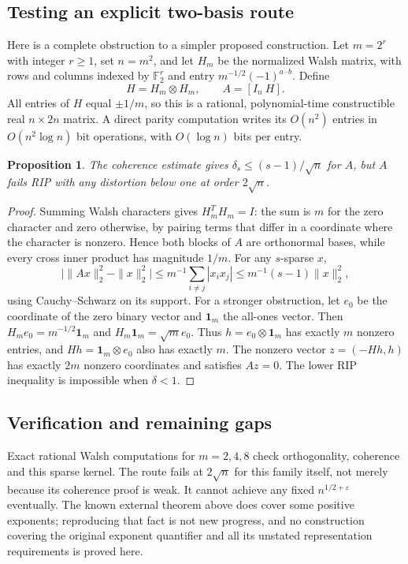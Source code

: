 \documentclass[11pt]{article}
\newtheorem{proposition}{Proposition}
\begin{document}
\subsection{Testing an explicit two-basis route}
Here is a complete obstruction to a simpler proposed construction. Let $m=2^r$ with integer $r\ge1$, set $n=m^2$, and let $H_m$ be the normalized Walsh matrix, with rows and columns indexed by $\mathbb F_2^r$ and entry $m^{-1/2}(-1)^{a\cdot b}$. Define
\[
H=H_m\otimes H_m,\qquad A=[I_n\ H].
\]
All entries of $H$ equal $\pm1/m$, so this is a rational, polynomial-time constructible real $n\times2n$ matrix. A direct parity computation writes its $O(n^2)$ entries in $O(n^2\log n)$ bit operations, with $O(\log n)$ bits per entry.
\begin{proposition}
The coherence estimate gives $\delta_s\le(s-1)/\sqrt n$ for $A$, but $A$ fails RIP with any distortion below one at order $2\sqrt n$.
\end{proposition}
\begin{proof}
Summing Walsh characters gives $H_m^TH_m=I$: the sum is $m$ for the zero character and zero otherwise, by pairing terms that differ in a coordinate where the character is nonzero. Hence both blocks of $A$ are orthonormal bases, while every cross inner product has magnitude $1/m$. For any $s$-sparse $x$,
\[
\big|\|Ax\|_2^2-\|x\|_2^2\big|
\le m^{-1}\sum_{i\ne j}|x_ix_j|
\le m^{-1}(s-1)\|x\|_2^2,
\]
using Cauchy--Schwarz on its support. For a stronger obstruction, let $e_0$ be the coordinate of the zero binary vector and $\mathbf1_m$ the all-ones vector. Then $H_me_0=m^{-1/2}\mathbf1_m$ and $H_m\mathbf1_m=\sqrt m e_0$. Thus $h=e_0\otimes\mathbf1_m$ has exactly $m$ nonzero entries, and $Hh=\mathbf1_m\otimes e_0$ also has exactly $m$. The nonzero vector $z=(-Hh,h)$ has exactly $2m$ nonzero coordinates and satisfies $Az=0$. The lower RIP inequality is impossible when $\delta<1$.
\end{proof}
\subsection{Verification and remaining gaps}
Exact rational Walsh computations for $m=2,4,8$ check orthogonality, coherence and this sparse kernel. The route fails at $2\sqrt n$ for this family itself, not merely because its coherence proof is weak. It cannot achieve any fixed $n^{1/2+\varepsilon}$ eventually. The known external theorem above does cover some positive exponents; reproducing that fact is not new progress, and no construction covering the original exponent quantifier and all its unstated representation requirements is proved here.
\end{document}
